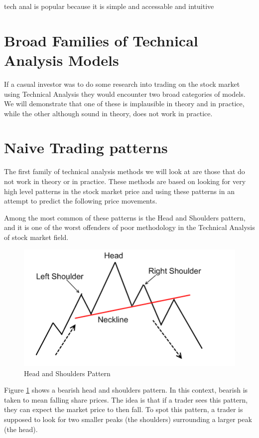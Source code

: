 \documentclass{report}
\begin{document}
tech anal is popular because it is simple and accessable and intuitive

\section{Broad Families of Technical Analysis Models}

If a casual investor was to do some research into trading on the stock market using Technical Analysis they would encounter two broad categories of models. We will demonstrate that one of these is implausible in theory and in practice, while the other although sound in theory, does not work in practice.

\section{Naive Trading patterns}

The first family of technical analysis methods we will look at are those that do not work in theory or in practice. These methods are based on looking for very high level patterns in the stock market price and using these patterns in an attempt to predict the following price movements.

Among the most common of these patterns is the Head and Shoulders pattern, and it is one of the worst offenders of poor methodology in the Technical Analysis of stock market field.

\begin{figure}[H]
	\caption{Head and Shoulders Pattern \cite{website:headshoulders}}
	\centerline{\includegraphics[width=\textwidth]{vis/headshoulders.png}}
	\label{fig:headshoulders}
\end{figure}

Figure \ref{fig:headshoulders} shows a bearish head and shoulders pattern. In this context, bearish is taken to mean falling share prices. The idea is that if a trader sees this pattern, they can expect the market price to then fall. To spot this pattern, a trader is supposed to look for two smaller peaks (the shoulders) surrounding a larger peak (the head). 
\end{document}
